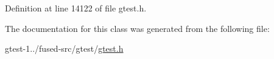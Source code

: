 \-Definition at line 14122 of file gtest.\-h.



\-The documentation for this class was generated from the following file\-:\begin{DoxyCompactItemize}
\item 
gtest-\/1../fused-\/src/gtest/\hyperlink{fused-src_2gtest_2gtest_8h}{gtest.\-h}\end{DoxyCompactItemize}
